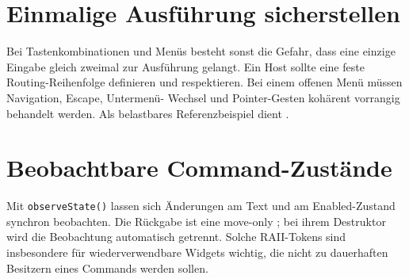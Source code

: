 \section{Einmalige Ausführung sicherstellen}
Bei Tastenkombinationen und Menüs besteht
sonst die Gefahr, dass eine einzige Eingabe
gleich zweimal zur Ausführung gelangt.
Ein Host sollte eine feste Routing-Reihenfolge
definieren und 
respektieren. Bei einem offenen Menü
müssen Navigation, Escape, Untermenü-
Wechsel und Pointer-Gesten kohärent
vorrangig behandelt werden.
Als belastbares Referenzbeispiel dient
.

\section{Beobachtbare Command-Zustände}
Mit \texttt{observeState()} lassen sich Änderungen
am Text und am Enabled-Zustand synchron beobachten.
Die Rückgabe ist eine move-only
; bei ihrem
Destruktor wird die Beobachtung
automatisch getrennt. Solche RAII-Tokens
sind insbesondere für wiederverwendbare
Widgets wichtig, die nicht zu
dauerhaften Besitzern eines Commands
werden sollen.

